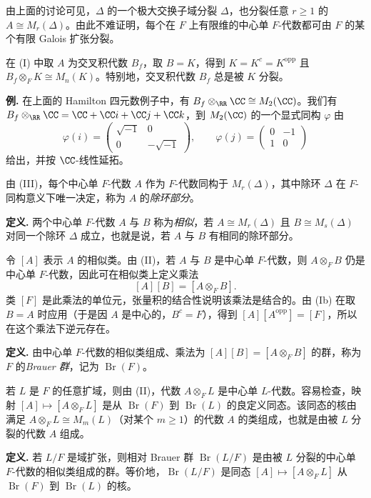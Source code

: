 由上面的讨论可见，$\Delta$ 的一个极大交换子域分裂 $\Delta$，也分裂任意 $r\geq1$ 的 $A\cong M_r(\Delta)$。由此不难证明，每个在 $F$ 上有限维的中心单 $F$-代数都可由 $F$ 的某个有限 Galois 扩张分裂。

在 (I) 中取 $A$ 为交叉积代数 $B_f$，取 $B=K$，得到 $K=K^c=K^{\operatorname{opp}}$ 且 $B_f\otimes_F K\cong M_n(K)$。特别地，交叉积代数 $B_f$ 总是被 $K$ 分裂。

\noindent\textbf{例.} 在上面的 Hamilton 四元数例子中，有 $B_f\otimes_{\RR}\CC\cong M_2(\CC)$。我们有 $B_f\otimes_{\RR}\CC=\CC+\CC i+\CC j+\CC k$，到 $M_2(\CC)$ 的一个显式同构 $\varphi$ 由
\[
  \varphi(i)=\begin{pmatrix}\sqrt{-1}&0\\0&-\sqrt{-1}\end{pmatrix},
  \qquad
  \varphi(j)=\begin{pmatrix}0&-1\\1&0\end{pmatrix}
\]
给出，并按 $\CC$-线性延拓。

由 (III)，每个中心单 $F$-代数 $A$ 作为 $F$-代数同构于 $M_r(\Delta)$，其中除环 $\Delta$ 在 $F$-同构意义下唯一决定，称为 $A$ 的\emph{除环部分}。

\noindent\textbf{定义.} 两个中心单 $F$-代数 $A$ 与 $B$ 称为\emph{相似}，若 $A\cong M_r(\Delta)$ 且 $B\cong M_s(\Delta)$ 对同一个除环 $\Delta$ 成立，也就是说，若 $A$ 与 $B$ 有相同的除环部分。

令 $[A]$ 表示 $A$ 的相似类。由 (II)，若 $A$ 与 $B$ 是中心单 $F$-代数，则 $A\otimes_F B$ 仍是中心单 $F$-代数，因此可在相似类上定义乘法
\[
  [A][B]=[A\otimes_F B].
\]
类 $[F]$ 是此乘法的单位元，张量积的结合性说明该乘法是结合的。由 (Ib) 在取 $B=A$ 时应用（于是因 $A$ 是中心的，$B^c=F$），得到 $[A][A^{\operatorname{opp}}]=[F]$，所以在这个乘法下逆元存在。

\noindent\textbf{定义.} 由中心单 $F$-代数的相似类组成、乘法为 $[A][B]=[A\otimes_F B]$ 的群，称为 $F$ 的\emph{Brauer 群}，记为 $\operatorname{Br}(F)$。

若 $L$ 是 $F$ 的任意扩域，则由 (II)，代数 $A\otimes_F L$ 是中心单 $L$-代数。容易检查，映射 $[A]\mapsto[A\otimes_F L]$ 是从 $\operatorname{Br}(F)$ 到 $\operatorname{Br}(L)$ 的良定义同态。该同态的核由满足 $A\otimes_F L\cong M_m(L)$（对某个 $m\geq1$）的代数 $A$ 的类组成，也就是由被 $L$ 分裂的代数 $A$ 组成。

\noindent\textbf{定义.} 若 $L/F$ 是域扩张，则相对 Brauer 群 $\operatorname{Br}(L/F)$ 是由被 $L$ 分裂的中心单 $F$-代数的相似类组成的群。等价地，$\operatorname{Br}(L/F)$ 是同态 $[A]\mapsto[A\otimes_F L]$ 从 $\operatorname{Br}(F)$ 到 $\operatorname{Br}(L)$ 的核。

